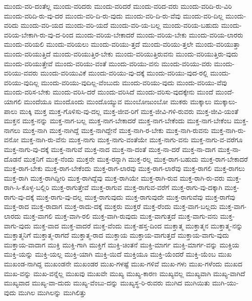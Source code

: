 {ಮುಂದು-ವರಿ-ದಂತೆಲ್ಲ
ಮುಂದು-ವರಿದರು
ಮುಂದು-ವರಿದರೆ
ಮುಂದು-ವರಿದ-ವರು
ಮುಂದು-ವರಿದಿ-ರು-ವಿರಿ
ಮುಂದು-ವರಿದಿ-ರು-ವು-ದರ
ಮುಂದು-ವರಿ-ದಿ-ರು-ವುದು
ಮುಂದು-ವರಿ-ದಿ-ರು-ವೆವು
ಮುಂದು-ವರಿ-ದಿಲ್ಲ
ಮುಂದು-ವರಿದು
ಮುಂದು-ವರಿ-ಯದ
ಮುಂದು-ವರಿ-ಯದೆ
ಮುಂದು-ವರಿ-ಯ-ಬಲ್ಲ
ಮುಂದು-ವರಿಯ-ಬಹುದು
ಮುಂದು-ವರಿಯ-ಬೇಕಾಗಿ-ರು-ವು-ದ-ರಿಂದ
ಮುಂದು-ವರಿಯ-ಬೇಕಾದರೆ
ಮುಂದು-ವರಿಯ-ಬೇಕು
ಮುಂದು-ವರಿಯ-ಲಾರರು
ಮುಂದು-ವರಿಯಲಿ
ಮುಂದು-ವರಿಯಲು
ಮುಂದು-ವರಿಯು-ತ್ತದೆ
ಮುಂದು-ವರಿಯು-ತ್ತಲೇ
ಮುಂದು-ವರಿಯುತ್ತಾ
ಮುಂದು-ವರಿಯುತ್ತಿದೆ
ಮುಂದು-ವರಿಯುತ್ತಿರ-ಬೇಕು
ಮುಂದು-ವರಿಯುತ್ತಿರುವನು
ಮುಂದು-ವರಿಯುತ್ತಿರು-ವುದು
ಮುಂದು-ವರಿಯುತ್ತೇವೆ
ಮುಂದು-ವರಿಯು-ವಂತೆ
ಮುಂದು-ವರಿಯು-ವನು
ಮುಂದು-ವರಿಯು-ವರು
ಮುಂದು-ವರಿಯು-ವವರು
ಮುಂದು-ವರಿಯುವಿಕೆ
ಮುಂದು-ವರಿಯು-ವು-ದಕ್ಕೆ
ಮುಂದು-ವರಿಯು-ವುದ-ರಲ್ಲಿ
ಮುಂದು-ವರಿಯು-ವುದಿಲ್ಲ
ಮುಂದು-ವರಿಯು-ವುದಿಲ್ಲ-ವೆಂಬುದು
ಮುಂದು-ವರಿಯು-ವುದು
ಮುಂದು-ವರಿಯು-ವೆವು
ಮುಂದು-ವರಿಸ-ಬೇಕು
ಮುಂದು-ವರಿಸಿ-ದರೆ
ಮುಂದು-ವರಿಸಿದೆ
ಮುಂದು-ವರಿಸು-ವುದಕ್ಕೇನು
ಮುಂದೆ
ಮುಂದೆ-ಯಾಗಲಿ
ಮುಂದೆಯೂ
ಮುಂದೊಂದು
ಮುಂದೊಯ್ಯುವ
ಮುಂಬೋಜುಂಬೋ
ಮುಕರು
ಮುಕ್ಕಾಲು
ಮುಕ್ಕಾಲು-ಪಾಲು
ಮುಕ್ಕಿ
ಮುಕ್ತ
ಮುಕ್ತ-ಗೊಳಿಸು-ವು-ದಲ್ಲ
ಮುಕ್ತ-ಜೀವ-ರಿಗೆ
ಮುಕ್ತ-ಜೀವಿ-ಗಳಿ-ರುವರು
ಮುಕ್ತ-ಜೀವಿ-ಯಂತೆ
ಮುಕ್ತನ
ಮುಕ್ತ-ನನ್ನು
ಮುಕ್ತ-ನಾಗ-ಬಲ್ಲ
ಮುಕ್ತ-ನಾಗ-ಬೇಕಾದರೆ
ಮುಕ್ತ-ನಾಗ-ಬೇಕೆಂದು
ಮುಕ್ತ-ನಾಗ-ಬೇಕೆಂಬ
ಮುಕ್ತ-ನಾಗಲು
ಮುಕ್ತ-ನಾಗಿ
ಮುಕ್ತ-ನಾಗಿದ್ದೆ
ಮುಕ್ತ-ನಾಗಿದ್ದೇನೆ
ಮುಕ್ತ-ನಾಗಿ-ರ-ಬೇಕು
ಮುಕ್ತ-ನಾಗಿ-ರುವನು
ಮುಕ್ತ-ನಾಗಿ-ರು-ವನೋ
ಮುಕ್ತ-ನಾಗಿ-ರು-ವೆನು
ಮುಕ್ತ-ನಾಗು
ಮುಕ್ತ-ನಾಗು-ವಂತೆಯೇ
ಮುಕ್ತ-ನಾಗು-ವನು
ಮುಕ್ತ-ನಾಗು-ವ-ವರೆಗೂ
ಮುಕ್ತ-ನಾಗು-ವು-ದಕ್ಕೆ
ಮುಕ್ತ-ನಾಗುವೆ
ಮುಕ್ತ-ನಾದ
ಮುಕ್ತ-ನಾ-ದಂತೆ
ಮುಕ್ತ-ನಾ-ದರೆ
ಮುಕ್ತ-ನಾ-ದಾಗ
ಮುಕ್ತ-ನಾ-ದೊಡನೆ
ಮುಕ್ತನಿಗೆ
ಮುಕ್ತ-ನೆಂದು
ಮುಕ್ತನೇ
ಮುಕ್ತ-ರನ್ನಾಗಿ
ಮುಕ್ತ-ರಲ್ಲ
ಮುಕ್ತ-ರಾಗ-ಬಹುದು
ಮುಕ್ತ-ರಾಗ-ಬೇಕಾದರೆ
ಮುಕ್ತ-ರಾಗ-ಬೇಕು
ಮುಕ್ತ-ರಾಗ-ಬೇಕೆಂದು
ಮುಕ್ತ-ರಾಗ-ಲಾರವು
ಮುಕ್ತ-ರಾಗ-ಲಾರೆವು
ಮುಕ್ತ-ರಾಗಲಿ
ಮುಕ್ತ-ರಾಗಲು
ಮುಕ್ತ-ರಾಗಿ
ಮುಕ್ತ-ರಾಗಿದ್ದೀರಿ
ಮುಕ್ತ-ರಾಗಿದ್ದೆವು
ಮುಕ್ತ-ರಾಗಿಯೇ
ಮುಕ್ತ-ರಾಗಿ-ರುವ
ಮುಕ್ತ-ರಾಗಿ-ರು-ವರು
ಮುಕ್ತ-ರಾಗಿ-ಸಿ-ಕೊಳ್ಳ-ಬಲ್ಲಿರಿ
ಮುಕ್ತ-ರಾಗುತ್ತೇವೆ
ಮುಕ್ತ-ರಾಗುವ
ಮುಕ್ತ-ರಾಗುವ-ವರೆಗೆ
ಮುಕ್ತ-ರಾಗು-ವು-ದಕ್ಕಾಗಿ
ಮುಕ್ತ-ರಾಗು-ವು-ದಕ್ಕೆ
ಮುಕ್ತ-ರಾಗು-ವು-ದಲ್ಲ
ಮುಕ್ತ-ರಾಗುವುದು
ಮುಕ್ತ-ರಾಗುವುದೇ
ಮುಕ್ತ-ರಾಗುವೆವು
ಮುಕ್ತ-ರಾಗೆವು
ಮುಕ್ತ-ರಾದ
ಮುಕ್ತ-ರಾದಾಗ
ಮುಕ್ತ-ರಾದು-ದಕ್ಕೆ
ಮುಕ್ತರು
ಮುಕ್ತರೆ
ಮುಕ್ತ-ರೆಂದು
ಮುಕ್ತ-ವಾಗ-ಬಲ್ಲದು
ಮುಕ್ತ-ವಾಗ-ಲಾರದು
ಮುಕ್ತ-ವಾಗಲಿ
ಮುಕ್ತ-ವಾಗಿ-ರಲಿ
ಮುಕ್ತ-ವಾಗಿ-ರುವುದು
ಮುಕ್ತ-ವಾಗುತ್ತದೆ
ಮುಕ್ತ-ವಾಗು-ವನು
ಮುಕ್ತ-ವಾಗು-ವುದು
ಮುಕ್ತ-ವಾದ
ಮುಕ್ತ-ವಾದರೆ
ಮುಕ್ತ-ವೆಂದು
ಮುಕ್ತ-ಹಸ್ತ-ದಿಂದ
ಮುಕ್ತಾತ್ಮ
ಮುಕ್ತಾತ್ಮನ
ಮುಕ್ತಾತ್ಮ-ನನ್ನು
ಮುಕ್ತಾತ್ಮನಿಗೆ
ಮುಕ್ತಾತ್ಮ-ರಾಗದೆ
ಮುಕ್ತಾತ್ಮ-ರಾದ
ಮುಕ್ತಾಯ
ಮುಕ್ತಾಯ-ವಾಗುತ್ತದೆ
ಮುಕ್ತಾಯ-ವಾಗು-ವುದು
ಮುಕ್ತಾಯ-ವಾದಾಗ
ಮುಕ್ತಿ
ಮುಕ್ತಿ-ಗಾಗಿ
ಮುಕ್ತಿಗೆ
ಮುಕ್ತಿ-ಚಿಂತನೆ
ಮುಕ್ತಿ-ಮಾರ್ಗ
ಮುಕ್ತಿ-ಮಾರ್ಗ-ವನ್ನು
ಮುಕ್ತಿಯ
ಮುಕ್ತಿ-ಯನ್ನು
ಮುಕ್ತಿ-ಯಲ್ಲ
ಮುಕ್ತಿ-ಯಾಗಿ
ಮುಕ್ತಿ-ಯಿದೆ
ಮುಕ್ತಿಯೂ
ಮುಕ್ತಿ-ಯೆಂದರೆ
ಮುಕ್ತಿ-ಯೆಂಬ
ಮುಖ
ಮುಖಂಡ-ನಾಗಿದ್ದ
ಮುಖಂಡನೇ
ಮುಖಂಡರ
ಮುಖ-ಗಳಷ್ಟೆ
ಮುಖ-ಗಳಿವೆ
ಮುಖ-ಗಳು
ಮುಖ-ಗಳೆಂದು
ಮುಖದ
ಮುಖ-ವನ್ನು
ಮುಖ-ವನ್ನೆಲ್ಲ
ಮುಖವು
ಮುಖವೇ
ಮುಖ್ಯ
ಮುಖ್ಯ-ಕಾರಣ
ಮುಖ್ಯವಲ್ಲ
ಮುಖ್ಯವಾಗಿ
ಮುಖ್ಯ-ವಾಗಿದೆ
ಮುಖ್ಯವಾದ
ಮುಖ್ಯ-ವಾ-ದುದು
ಮುಖ್ಯ-ವೆಂಬು-ದನ್ನು
ಮುಖ್ಯಸ್ಥ-ರಿ-ರುವರು
ಮುಗಿದ
ಮುಗಿಯಿತು
ಮುಗಿ-ಯು-ವುದು
ಮುಗಿಲ
ಮುಗಿಲನ್ನು
ಮುಗಿಲಿತ್ತು
}
